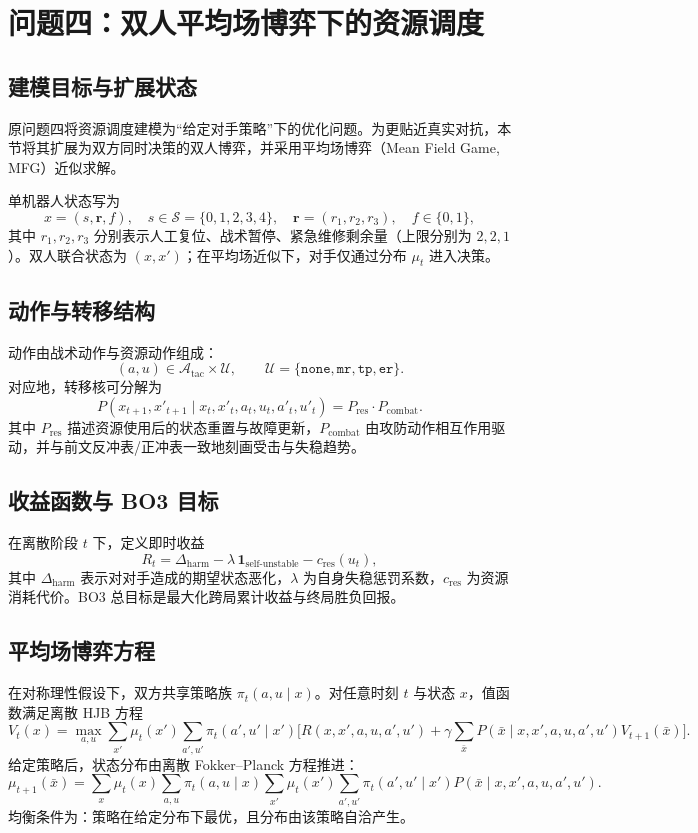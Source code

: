 \section{问题四：双人平均场博弈下的资源调度}

\subsection{建模目标与扩展状态}
原问题四将资源调度建模为“给定对手策略”下的优化问题。为更贴近真实对抗，本节将其扩展为双方同时决策的双人博弈，并采用平均场博弈（Mean Field Game, MFG）近似求解。

单机器人状态写为
\[
x=(s,\mathbf{r},f),\quad
s\in\mathcal{S}=\{0,1,2,3,4\},\quad
\mathbf{r}=(r_1,r_2,r_3),\quad
f\in\{0,1\},
\]
其中 $r_1,r_2,r_3$ 分别表示人工复位、战术暂停、紧急维修剩余量（上限分别为 $2,2,1$）。双人联合状态为 $(x,x')$；在平均场近似下，对手仅通过分布 $\mu_t$ 进入决策。

\subsection{动作与转移结构}
动作由战术动作与资源动作组成：
\[
(a,u)\in\mathcal{A}_{\text{tac}}\times\mathcal{U},\qquad
\mathcal{U}=\{\texttt{none},\texttt{mr},\texttt{tp},\texttt{er}\}.
\]
对应地，转移核可分解为
\[
P(x_{t+1},x'_{t+1}\mid x_t,x'_t,a_t,u_t,a'_t,u'_t)
=
P_{\text{res}}\cdot P_{\text{combat}}.
\]
其中 $P_{\text{res}}$ 描述资源使用后的状态重置与故障更新，$P_{\text{combat}}$ 由攻防动作相互作用驱动，并与前文反冲表/正冲表一致地刻画受击与失稳趋势。

\subsection{收益函数与 BO3 目标}
在离散阶段 $t$ 下，定义即时收益
\[
R_t = \Delta_{\text{harm}} - \lambda\,\mathbf{1}_{\text{self-unstable}} - c_{\text{res}}(u_t),
\]
其中 $\Delta_{\text{harm}}$ 表示对对手造成的期望状态恶化，$\lambda$ 为自身失稳惩罚系数，$c_{\text{res}}$ 为资源消耗代价。BO3 总目标是最大化跨局累计收益与终局胜负回报。

\subsection{平均场博弈方程}
在对称理性假设下，双方共享策略族 $\pi_t(a,u\mid x)$。对任意时刻 $t$ 与状态 $x$，值函数满足离散 HJB 方程
\[
V_t(x)=\max_{a,u}\sum_{x'}\mu_t(x')\sum_{a',u'}\pi_t(a',u'\mid x')
\Big[
R(x,x',a,u,a',u')
+\gamma\sum_{\bar x}P(\bar x\mid x,x',a,u,a',u')V_{t+1}(\bar x)
\Big].
\]
给定策略后，状态分布由离散 Fokker--Planck 方程推进：
\[
\mu_{t+1}(\bar x)=
\sum_x\mu_t(x)\sum_{a,u}\pi_t(a,u\mid x)
\sum_{x'}\mu_t(x')\sum_{a',u'}\pi_t(a',u'\mid x')
P(\bar x\mid x,x',a,u,a',u').
\]
均衡条件为：策略在给定分布下最优，且分布由该策略自洽产生。

